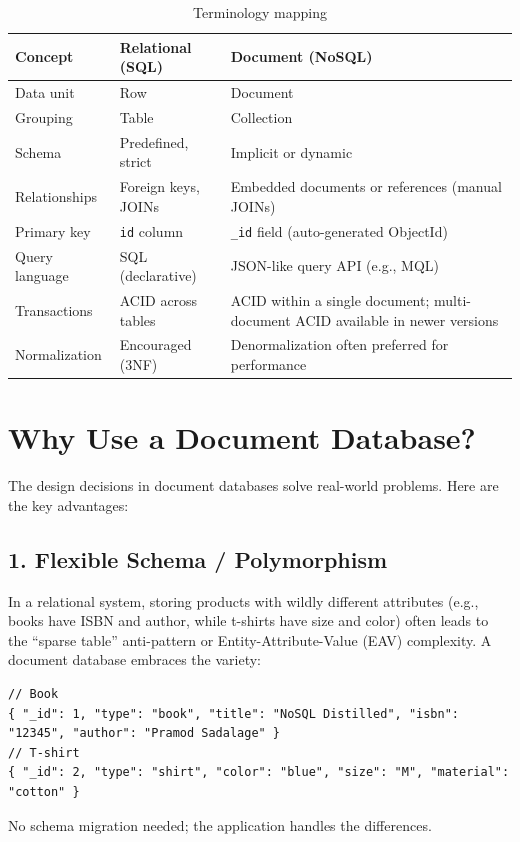 \documentclass[12pt,a4paper]{article}
\begin{document}
\renewcommand{\arraystretch}{1.3}
\begin{table}[h]
\centering
\begin{tabular}{|p{4cm}|p{5cm}|p{5cm}|}
\hline
\textbf{Concept} & \textbf{Relational (SQL)} & \textbf{Document (NoSQL)} \\
\hline
Data unit & Row & Document \\
Grouping & Table & Collection \\
Schema & Predefined, strict & Implicit or dynamic \\
Relationships & Foreign keys, JOINs & Embedded documents or references (manual JOINs) \\
Primary key & \texttt{id} column & \texttt{\_id} field (auto-generated ObjectId) \\
Query language & SQL (declarative) & JSON-like query API (e.g., MQL) \\
Transactions & ACID across tables & ACID within a single document; multi-document ACID available in newer versions \\
Normalization & Encouraged (3NF) & Denormalization often preferred for performance \\
\hline
\end{tabular}
\caption{Terminology mapping}
\label{tab:mapping}
\end{table}

\section{Why Use a Document Database?}
The design decisions in document databases solve real-world problems. Here are the key advantages:

\subsection{1. Flexible Schema / Polymorphism}
In a relational system, storing products with wildly different attributes (e.g., books have ISBN and author, while t-shirts have size and color) often leads to the ``sparse table'' anti-pattern or Entity-Attribute-Value (EAV) complexity. A document database embraces the variety:
\begin{lstlisting}[caption=Polymorphic collection: products, label=lst:polymorph]
// Book
{ "_id": 1, "type": "book", "title": "NoSQL Distilled", "isbn": "12345", "author": "Pramod Sadalage" }
// T-shirt
{ "_id": 2, "type": "shirt", "color": "blue", "size": "M", "material": "cotton" }
\end{lstlisting}
No schema migration needed; the application handles the differences.
\end{document}
